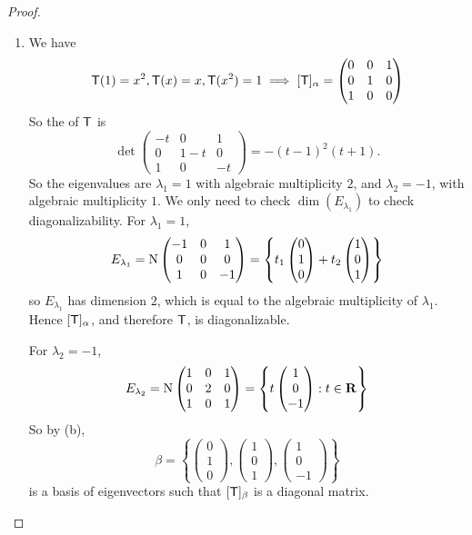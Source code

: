 \begin{proof}
\begin{enumerate}
\item We have
\begin{align*}
    \textsf{T}(1) = x^2, \textsf{T}(x) = x, \textsf{T}(x^2) = 1
    \implies [\textsf{T}]_{\alpha} = \begin{pmatrix} 0 & 0 & 1 \\ 0 & 1 & 0 \\ 1 & 0 & 0 \end{pmatrix}
\end{align*}
So the \CPOLY{} of \(\textsf{T}\) is
\[
    \det \begin{pmatrix} -t & 0 & 1 \\ 0 & 1-t & 0 \\ 1 & 0 & -t \end{pmatrix} = -(t - 1)^2(t + 1). 
\]
So the eigenvalues are \(\lambda_1 = 1\) with algebraic multiplicity \(2\), and \(\lambda_2 = -1\), with algebraic multiplicity \(1\).
We only need to check \(\dim(E_{\lambda_1})\) to check diagonalizability.
For \(\lambda_1 = 1\),
\[
    E_{\lambda_1} = \mathrm{N} \begin{pmatrix} -1 & 0 & 1 \\ 0 & 0 & 0 \\ 1 & 0 & -1 \end{pmatrix}
    = \left\{ t_1 \begin{pmatrix} 0 \\ 1 \\ 0 \end{pmatrix} + t_2 \begin{pmatrix} 1 \\ 0 \\ 1 \end{pmatrix} \right\}
\]
so \(E_{\lambda_1}\) has dimension \(2\), which is equal to the algebraic multiplicity of \(\lambda_1\).
Hence \([\textsf{T}]_{\alpha}\), and therefore \(\textsf{T}\), is diagonalizable.

For \(\lambda_2 = -1\),
\[
    E_{\lambda_2} = \mathrm{N} \begin{pmatrix} 1 & 0 & 1 \\ 0 & 2 & 0 \\ 1 & 0 & 1 \end{pmatrix}
    = \left\{ t \begin{pmatrix} 1 \\ 0 \\ -1 \end{pmatrix} : t \in \mathbf{R} \right\}
\]
So by (b),
\[
    \beta = \left\{
        \begin{pmatrix} 0 \\ 1 \\ 0 \end{pmatrix},
        \begin{pmatrix} 1 \\ 0 \\ 1 \end{pmatrix},
        \begin{pmatrix} 1 \\ 0 \\ -1 \end{pmatrix}
    \right\}
\]
is a basis of eigenvectors such that \([\textsf{T}]_{\beta}\) is a diagonal matrix.


\end{enumerate}
\end{proof}
